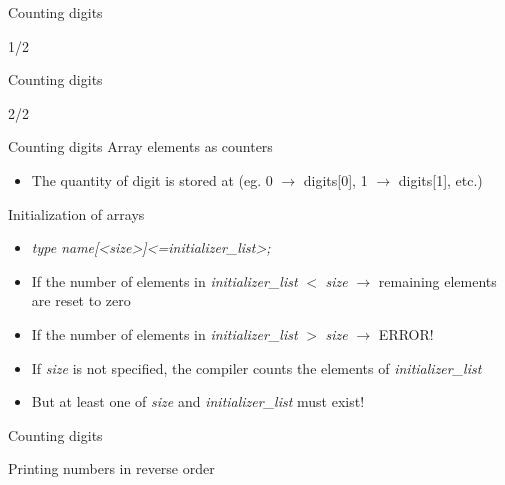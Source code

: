 \documentclass[usenames,dvipsnames,aspectratio=169]{beamer}
\begin{document}
\begin{frame}{Counting digits}
    \begin{exampleblock}{ 1/2}
    \footnotesize
    
  \end{exampleblock}
\end{frame}

\begin{frame}{Counting digits}
    \begin{exampleblock}{ 2/2}
    \scriptsize
    
  \end{exampleblock}
\end{frame}

\begin{frame}{Counting digits}
  Array elements as counters
  \begin{itemize}
    \item[] The quantity of digit  is stored at  (eg. 0 $\to$ digits[0], 1 $\to$ digits[1], etc.)
  \end{itemize}
  \vfill
  Initialization of arrays
  \begin{itemize}
    \item \emph{type name[<size>]<={initializer\_list}>;}
    \item If the number of elements in \emph{initializer\_list} $<$ \emph{size} $\to$ remaining elements are reset to zero
    \item If the number of elements in \emph{initializer\_list} $>$ \emph{size} $\to$ ERROR!
    \item If \emph{size} is not specified, the compiler counts the elements of \emph{initializer\_list}
    \item But at least one of \emph{size} and \emph{initializer\_list} must exist!
  \end{itemize}
\end{frame}

\begin{frame}{Counting digits}
    \begin{exampleblock}{}
    \tiny
    
  \end{exampleblock}
\end{frame}

\begin{frame}{Printing numbers in reverse order}
    \begin{exampleblock}{}
    \fontsize{8}{9} \selectfont
    
  \end{exampleblock}
\end{frame}
\end{document}
